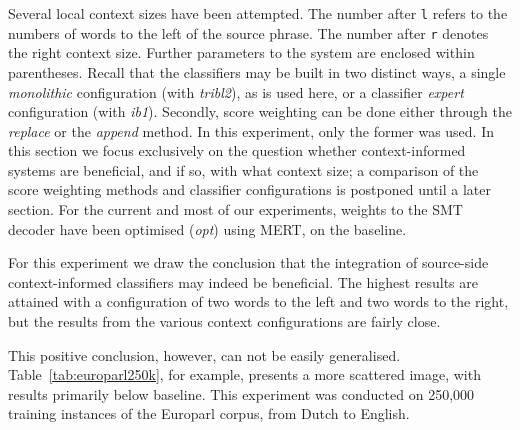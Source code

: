 \documentclass[smallextended]{svjour3}       %
\theoremstyle{break}
\begin{document}
Several local context sizes have been attempted. The number after \texttt{l}
refers to the numbers of words to the left of the source phrase. The number
after \texttt{r} denotes the right context size. Further parameters to the
system are enclosed within parentheses.  Recall that the classifiers may be
built in two distinct ways, a single \emph{monolithic} configuration (with
\emph{tribl2}), as is used here, or a classifier \emph{expert} configuration
(with \emph{ib1}).  Secondly, score weighting can be done either through the
\emph{replace} or the \emph{append} method. In this experiment, only the former
was used.  In this section we focus exclusively on the question whether
context-informed systems are beneficial, and if so, with what context size; a
comparison of the score weighting methods and classifier configurations is
postponed until a later section.  For the current and most of our experiments,
weights to the SMT decoder have been optimised (\emph{opt}) using MERT, on the
baseline.

For this experiment we draw the conclusion that the integration of
source-side context-informed classifiers may indeed be beneficial.
The highest results are attained with a configuration of two words to
the left and two words to the right, but the results from the various
context configurations are fairly close. 

This positive conclusion, however, can not be easily generalised.
Table~\ref{tab:europarl250k}, for example, presents a more scattered image,
with results primarily below baseline. This experiment was conducted on 250,000
training instances of the Europarl corpus, from Dutch to
English.
\end{document}
